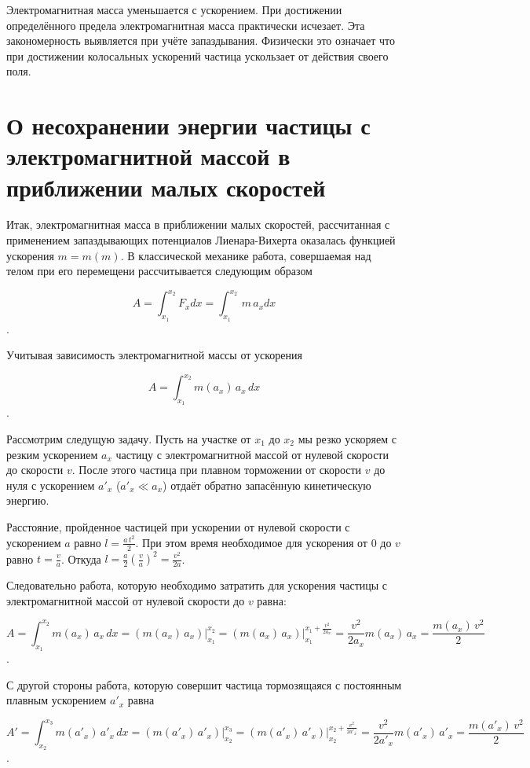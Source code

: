 \documentclass{article}
\begin{document}
Электромагнитная масса уменьшается с ускорением. При достижении определённого предела электромагнитная масса практически исчезает. Эта закономерность выявляется при учёте запаздывания. Физически это означает что при достижении колосальных ускорений частица ускользает от действия своего поля.


\section{О несохранении энергии частицы с электромагнитной массой в приближении малых скоростей}

Итак, электромагнитная масса в приближении малых скоростей, рассчитанная с применением запаздывающих потенциалов Лиенара-Вихерта оказалась функцией ускорения $m = m\left(m\right)$. В классической механике работа, совершаемая над телом при его перемещени рассчитывается следующим образом

\[A = \int_{x_1}^{x_2}F_x dx = \int_{x_1}^{x_2}\,m \, a_x dx\].

Учитывая зависимость электромагнитной массы от ускорения

\[A = \int_{x_1}^{x_2} m(a_x) \, a_x \, dx\].

Рассмотрим следущую задачу. Пусть на участке от $x_1$ до $x_2$ мы резко ускоряем с резким ускорением $a_x$ частицу с электромагнитной массой от нулевой скорости до скорости $v$. После этого частица при плавном торможении от скорости $v$ до нуля с ускорением $a'_x$ ($a'_x\ll a_x$) отдаёт обратно запасённую кинетическую энергию.

Расстояние, пройденное частицей при ускорении от нулевой скорости с ускорением $a$ равно $l = \frac{a\, t^2}{2}$. При этом время необходимое для ускорения от $0$ до $v$ равно $t = \frac{v}{a}$. Откуда $l = \frac{a}{2} \left(\frac{v}{a}\right)^2 = \frac{v^2}{2a}$.

Следовательно работа, которую необходимо затратить для ускорения частицы с электромагнитной массой от нулевой скорости до $v$ равна:

\[A = \int_{x_1}^{x_2} m(a_x) \, a_x \, dx = \left(m(a_x) \, a_x\right)\Bigg|_{x_1}^{x_2} = \left(m(a_x) \, a_x\right)\Bigg|_{x_1}^{x_1 + \frac{v^2}{2a_x}} = \frac{v^2}{2a_x} m(a_x) \, a_x = \frac{m(a_x) \, v^2}{2}\].

С другой стороны работа, которую совершит частица тормозящаяся с постоянным плавным ускорением $a'_x$ равна

\[A' = \int_{x_2}^{x_3} m(a'_x) \, a'_x \, dx = \left(m(a'_x) \, a'_x\right)\Bigg|_{x_2}^{x_3} = \left(m(a'_x) \, a'_x\right)\Bigg|_{x_2}^{x_2 + \frac{v^2}{2a'_x}} = \frac{v^2}{2a'_x} m(a'_x) \, a'_x = \frac{m(a'_x) \, v^2}{2}\].
\end{document}

